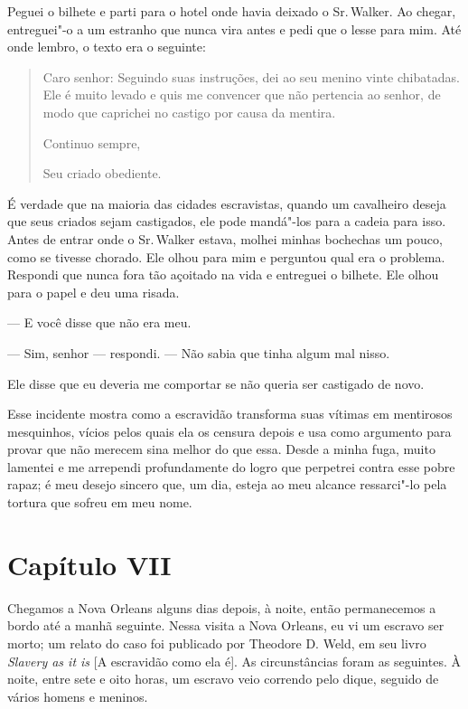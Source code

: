 Peguei o bilhete e parti para o hotel onde havia deixado o Sr.\,Walker.
Ao chegar, entreguei"-o a um estranho que nunca vira antes e pedi que o
lesse para mim. Até onde lembro, o texto era o seguinte:

\begin{quote}
Caro senhor: Seguindo suas instruções, dei ao seu menino vinte
chibatadas. Ele é muito levado e quis me convencer que não pertencia ao
senhor, de modo que caprichei no castigo por causa da mentira.

Continuo sempre,

Seu criado obediente.
\end{quote}

É verdade que na maioria das cidades escravistas, quando um cavalheiro
deseja que seus criados sejam castigados, ele pode mandá"-los para a
cadeia para isso. Antes de entrar onde o Sr.\,Walker estava, molhei
minhas bochechas um pouco, como se tivesse chorado. Ele olhou para mim e
perguntou qual era o problema. Respondi que nunca fora tão açoitado na
vida e entreguei o bilhete. Ele olhou para o papel e deu uma risada.

--- E você disse que não era meu.

--- Sim, senhor --- respondi. --- Não sabia que tinha algum mal nisso.

Ele disse que eu deveria me comportar se não queria ser castigado de
novo.

Esse incidente mostra como a escravidão transforma suas vítimas em
mentirosos mesquinhos, vícios pelos quais ela os censura depois e usa
como argumento para provar que não merecem sina melhor do que essa.
Desde a minha fuga, muito lamentei e me arrependi profundamente do logro \label{ref4}
que perpetrei contra esse pobre rapaz; é meu desejo sincero que, um dia,
esteja ao meu alcance ressarci"-lo pela tortura que sofreu em meu nome.

\chapter*{Capítulo VII}

Chegamos a Nova Orleans alguns dias depois, à noite, então permanecemos
a bordo até a manhã seguinte. Nessa visita a Nova Orleans, eu vi um
escravo ser morto; um relato do caso foi publicado por Theodore D. Weld,
em seu livro \emph{Slavery as it is} {[}A escravidão como ela
é{]}. As circunstâncias foram as seguintes. À noite, entre sete e oito
horas, um escravo veio correndo pelo dique, seguido de vários homens e
meninos.

